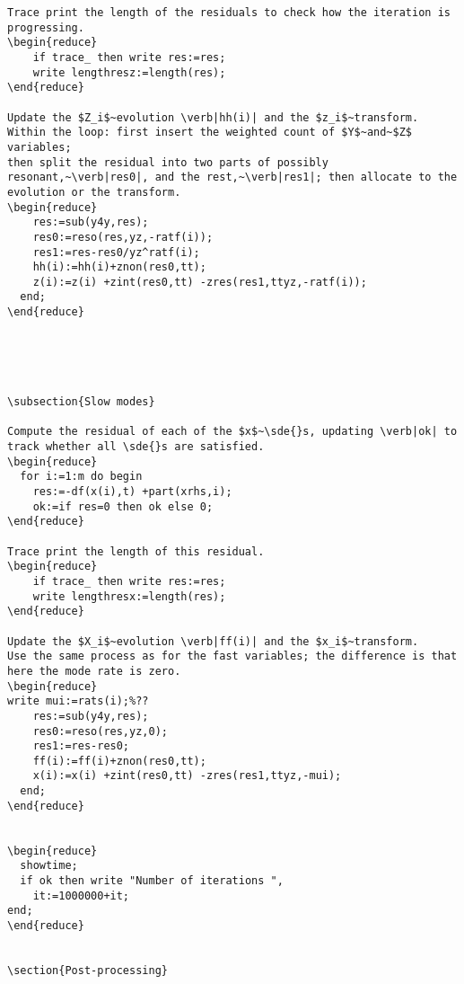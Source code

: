 \documentclass[11pt,a5paper]{article}
\begin{document}
\begin{reduce}
\begin{verbatim}
Trace print the length of the residuals to check how the iteration is progressing.
\begin{reduce}
    if trace_ then write res:=res;
    write lengthresz:=length(res);
\end{reduce}

Update the $Z_i$~evolution \verb|hh(i)| and the $z_i$~transform.
Within the loop: first insert the weighted count of $Y$~and~$Z$ variables;
then split the residual into two parts of possibly resonant,~\verb|res0|, and the rest,~\verb|res1|; then allocate to the evolution or the transform.
\begin{reduce}
    res:=sub(y4y,res);
    res0:=reso(res,yz,-ratf(i));
    res1:=res-res0/yz^ratf(i);
    hh(i):=hh(i)+znon(res0,tt);
    z(i):=z(i) +zint(res0,tt) -zres(res1,ttyz,-ratf(i));
  end;
\end{reduce}





\subsection{Slow modes}

Compute the residual of each of the $x$~\sde{}s, updating \verb|ok| to track whether all \sde{}s are satisfied.
\begin{reduce}
  for i:=1:m do begin
    res:=-df(x(i),t) +part(xrhs,i);
    ok:=if res=0 then ok else 0;
\end{reduce}

Trace print the length of this residual.
\begin{reduce}
    if trace_ then write res:=res;
    write lengthresx:=length(res);
\end{reduce}

Update the $X_i$~evolution \verb|ff(i)| and the $x_i$~transform.
Use the same process as for the fast variables; the difference is that here the mode rate is zero.
\begin{reduce}
write mui:=rats(i);%??
    res:=sub(y4y,res);
    res0:=reso(res,yz,0);
    res1:=res-res0;
    ff(i):=ff(i)+znon(res0,tt);
    x(i):=x(i) +zint(res0,tt) -zres(res1,ttyz,-mui);
  end;
\end{reduce}


\begin{reduce}
  showtime;
  if ok then write "Number of iterations ",
    it:=1000000+it;
end;
\end{reduce}


\section{Post-processing}


\end{verbatim}
\end{reduce}
\end{document}
